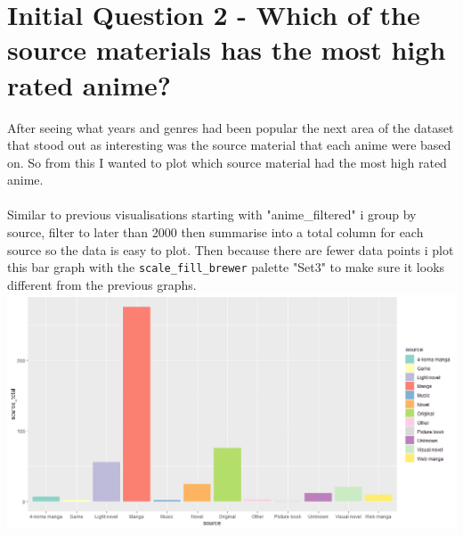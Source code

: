 \documentclass[a4paper]{article}
\begin{document}
	\section* {Initial Question 2 - Which of the source materials has the most high rated anime?}	
	After seeing what years and genres had been popular the next area of the dataset that stood out as interesting was the source material that each anime were based on. So from this I wanted to plot which source material had the most high rated anime.\\
	\\
	Similar to previous visualisations starting with "anime\_filtered" i group by source, filter to later than 2000 then summarise into a total column for each source so the data is easy to plot. Then because there are fewer data points i plot this bar graph with the \texttt{scale\_fill\_brewer} palette "Set3" to make sure it looks different from the previous graphs.\\
	\noindent\includegraphics[scale=0.60]{TopAnimeBySource.png}
	
	\pagebreak
	
\end{document}
